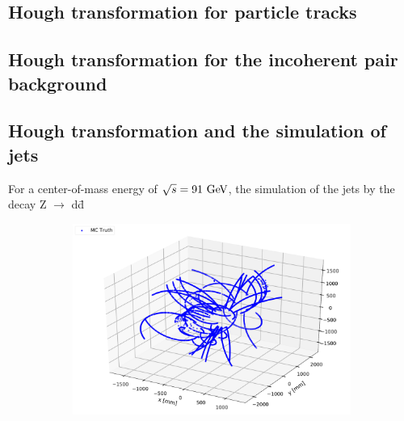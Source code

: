 \documentclass{cernatsnote}
\begin{document}
\subsection{Hough transformation for particle tracks}
\subsection{Hough transformation for the incoherent pair background}
\subsection{Hough transformation and the simulation of jets}

For a center-of-mass energy of $\sqrt{s} = 91 \,\mathrm{\,Ge\kern -0.1em V}$, the simulation of the jets by the decay Z $\rightarrow$ d\={d}

\begin{figure}[ht]
	\centering
	\begin{subfigure}[b]{0.3\textwidth}
        \includegraphics[width=\textwidth]{figures/Zdd_3D.pdf}
        \caption{}


\end{subfigure}
\end{figure}
\end{document}
